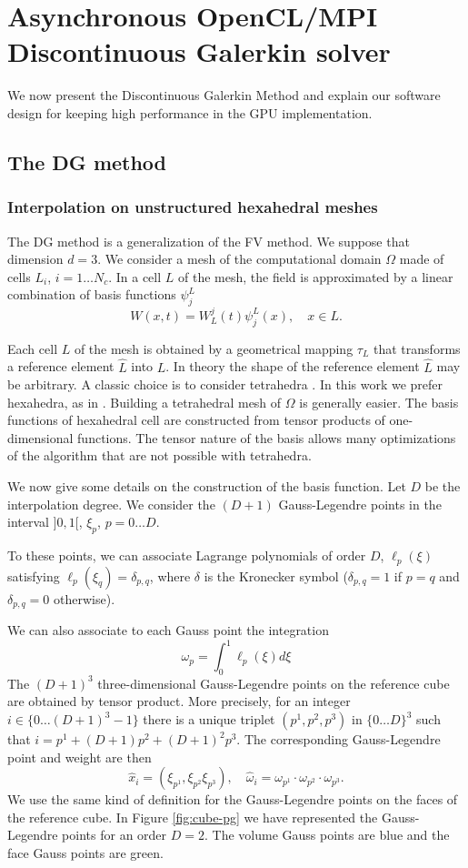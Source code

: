 \documentclass[preprint]{sig-alternate}
\begin{document}
\section{\label{async}Asynchronous OpenCL/MPI Discontinuous Galerkin solver}

We now present the Discontinuous Galerkin Method and explain our software
design for keeping high performance in the GPU implementation.
\subsection{The DG method}

\subsubsection{Interpolation on unstructured hexahedral meshes}
The DG method is a generalization of the FV method. We suppose that dimension $d=3$.
We consider a mesh of the computational domain $\Omega$ made of cells $L_i$, $i=1\ldots N_c$.
 In a cell $L$ of the mesh, the
field is approximated by a linear combination of  basis functions $\psi_j^L$
\begin{equation}\label{eq:expansion}
W(x,t)=W_{L}^{j}(t)\psi_{j}^{L}(x),\quad x\in L.
\end{equation}

Each cell $L$ of the mesh is obtained by a geometrical mapping $\tau_L$ that transforms a reference element $\hat L$ into $L$.
In theory the shape of the reference element $\hat L$ may be arbitrary. A classic choice is to consider tetrahedra \cite{hesthaven-2009}. In this work we prefer hexahedra, as in \cite{CFP06}. Building a tetrahedral mesh of $\Omega$ is generally easier. The basis functions of hexahedral cell are  constructed from tensor products of one-dimensional functions. The tensor nature of the basis allows many optimizations of the algorithm that are not possible with tetrahedra.

We now give some details on the construction of the basis function. Let $D$ be the interpolation degree. We consider the $(D+1)$ Gauss-Legendre points in the interval $]0,1[$, $\xi_p$, $p=0\ldots D$.

To these points, we can associate Lagrange polynomials of order $D$, $\ell_p(\xi)$ satisfying $\ell_p(\xi_q)=\delta_{p,q}$, where $\delta$ is the Kronecker symbol ($\delta_{p,q}=1$ if $p=q$ and $\delta_{p,q}=0$ otherwise).

We can also associate to each Gauss point the integration
$$
\omega_p =\int_0^1 \ell_p(\xi)d\xi
$$
The $(D+1)^3$ three-dimensional Gauss-Legendre points on the reference cube are obtained by tensor product. More precisely, for an integer $i\in\{0\ldots (D+1)^3-1\}$ there is a unique triplet $(p^1,p^2,p^3)$ in $\{0\ldots D\}^3$ such that $i=p^1+(D+1)p^2+(D+1)^2p^3$. The corresponding Gauss-Legendre point and weight are then
$$ \hat x _i = (\xi_{p^1},\xi_{p^2}\xi_{p^3}),\quad \hat \omega_i =\omega_{p^1}\cdot\omega_{p^2}\cdot\omega_{p^3}.$$ We use the same kind of definition for the Gauss-Legendre points on the faces of the reference cube. In Figure \ref{fig:cube-pg} we have represented the Gauss-Legendre points for an order $D=2$. The volume Gauss points are blue and the face Gauss points are green.
\end{document}
